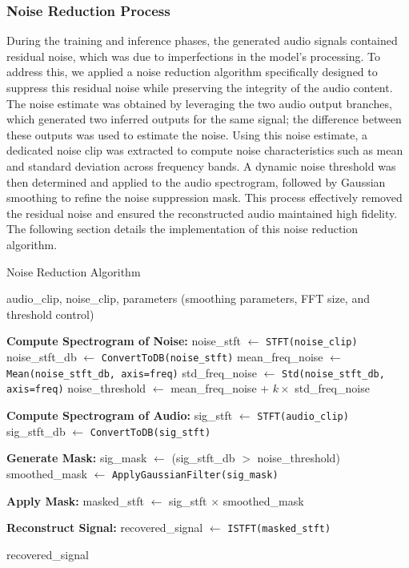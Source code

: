     \subsubsection{Noise Reduction Process}
    During the training and inference phases, the generated audio signals contained residual noise, which was due to imperfections in the model's processing. To address this, we applied a noise reduction algorithm specifically designed to suppress this residual noise while preserving the integrity of the audio content. The noise estimate was obtained by leveraging the two audio output branches, which generated two inferred outputs for the same signal; the difference between these outputs was used to estimate the noise. Using this noise estimate, a dedicated noise clip was extracted to compute noise characteristics such as mean and standard deviation across frequency bands. A dynamic noise threshold was then determined and applied to the audio spectrogram, followed by Gaussian smoothing to refine the noise suppression mask. This process effectively removed the residual noise and ensured the reconstructed audio maintained high fidelity.
    The following section details the implementation of this noise reduction algorithm.
    \begin{algorithm}[H]
        \caption{Noise Reduction Algorithm}
        \label{alg:noise_reduction}
        \begin{algorithmic}[1]
        \REQUIRE audio\_clip, noise\_clip, parameters (smoothing parameters, FFT size, and threshold control)
        
        \STATE \textbf{Compute Spectrogram of Noise:}
        \STATE noise\_stft $\gets$ \texttt{STFT(noise\_clip)}
        \STATE noise\_stft\_db $\gets$ \texttt{ConvertToDB(noise\_stft)}
        \STATE mean\_freq\_noise $\gets$ \texttt{Mean(noise\_stft\_db, axis=freq)}
        \STATE std\_freq\_noise $\gets$ \texttt{Std(noise\_stft\_db, axis=freq)}
        \STATE noise\_threshold $\gets$ mean\_freq\_noise + $k \times$ std\_freq\_noise
        
        \STATE \textbf{Compute Spectrogram of Audio:}
        \STATE sig\_stft $\gets$ \texttt{STFT(audio\_clip)}
        \STATE sig\_stft\_db $\gets$ \texttt{ConvertToDB(sig\_stft)}
        
        \STATE \textbf{Generate Mask:}
        \STATE sig\_mask $\gets$ (sig\_stft\_db $>$ noise\_threshold)
        \STATE smoothed\_mask $\gets$ \texttt{ApplyGaussianFilter(sig\_mask)}
        
        \STATE \textbf{Apply Mask:}
        \STATE masked\_stft $\gets$ sig\_stft $\times$ smoothed\_mask
        
        \STATE \textbf{Reconstruct Signal:}
        \STATE recovered\_signal $\gets$ \texttt{ISTFT(masked\_stft)}
        
        \RETURN recovered\_signal
        \end{algorithmic}
    \end{algorithm}
    
